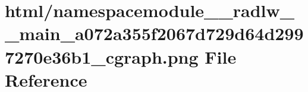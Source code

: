 \hypertarget{namespacemodule____radlw____main__a072a355f2067d729d64d2997270e36b1__cgraph_8png}{}\section{html/namespacemodule\+\_\+\+\_\+radlw\+\_\+\+\_\+main\+\_\+a072a355f2067d729d64d2997270e36b1\+\_\+cgraph.png File Reference}
\label{namespacemodule____radlw____main__a072a355f2067d729d64d2997270e36b1__cgraph_8png}
